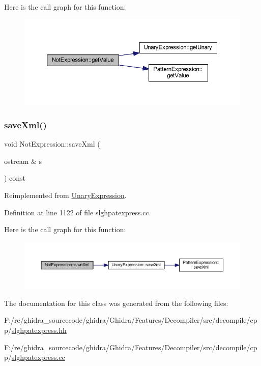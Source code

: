 Here is the call graph for this function\+:
\nopagebreak
\begin{figure}[H]
\begin{center}
\leavevmode
\includegraphics[width=350pt]{class_not_expression_a6122ccadabed688967cfa502d76d4b31_cgraph}
\end{center}
\end{figure}
\mbox{\label{class_not_expression_aa0d7fd2da95e71dfe35664328b219ebb}} 
\subsubsection{\texorpdfstring{saveXml()}{saveXml()}}
{\footnotesize\ttfamily void Not\+Expression\+::save\+Xml (\begin{DoxyParamCaption}\item[{ostream \&}]{s }\end{DoxyParamCaption}) const\hspace{0.3cm}{\ttfamily [virtual]}}



Reimplemented from \mbox{\hyperlink{class_unary_expression_a8b6b833f511d84b606baf8233d271255}{Unary\+Expression}}.



Definition at line 1122 of file slghpatexpress.\+cc.

Here is the call graph for this function\+:
\nopagebreak
\begin{figure}[H]
\begin{center}
\leavevmode
\includegraphics[width=350pt]{class_not_expression_aa0d7fd2da95e71dfe35664328b219ebb_cgraph}
\end{center}
\end{figure}


The documentation for this class was generated from the following files\+:\begin{DoxyCompactItemize}
\item 
F\+:/re/ghidra\+\_\+sourcecode/ghidra/\+Ghidra/\+Features/\+Decompiler/src/decompile/cpp/\mbox{\hyperlink{slghpatexpress_8hh}{slghpatexpress.\+hh}}\item 
F\+:/re/ghidra\+\_\+sourcecode/ghidra/\+Ghidra/\+Features/\+Decompiler/src/decompile/cpp/\mbox{\hyperlink{slghpatexpress_8cc}{slghpatexpress.\+cc}}\end{DoxyCompactItemize}
